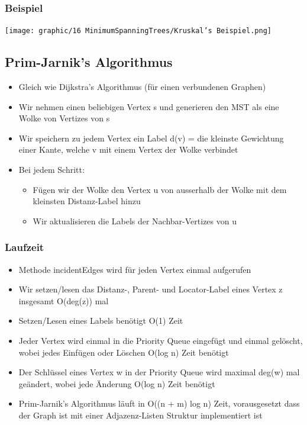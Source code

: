 \subsubsection{Beispiel}
\begin{center}
    \texttt{[image: graphic/16 MinimumSpanningTrees/Kruskal’s Beispiel.png]}
\end{center}
\vspace{-8pt}

\subsection{Prim-Jarnik’s Algorithmus}
\begin{itemize}
    \item Gleich wie Dijkstra’s Algorithmus (für einen verbundenen Graphen)
    \item Wir nehmen einen beliebigen Vertex s und generieren den MST als eine Wolke von Vertizes von s
    \item Wir speichern zu jedem Vertex ein Label d(v) = die kleinste Gewichtung einer Kante, welche v mit einem Vertex der Wolke verbindet
    \item Bei jedem Schritt:
    \begin{itemize}
        \item Fügen wir der Wolke den Vertex u von ausserhalb der Wolke mit dem kleinsten Distanz-Label hinzu
        \item Wir aktualisieren die Labels der Nachbar-Vertizes von u
    \end{itemize}
\end{itemize}
\subsubsection{Laufzeit}
\begin{itemize}
    \item Methode incidentEdges wird für jeden Vertex einmal aufgerufen
    \item Wir setzen/lesen das Distanz-, Parent- und Locator-Label eines Vertex z insgesamt O(deg(z)) mal
    \item Setzen/Lesen eines Labels benötigt O(1) Zeit
    \item Jeder Vertex wird einmal in die Priority Queue eingefügt und einmal gelöscht, wobei jedes Einfügen oder Löschen O(log n) Zeit benötigt
    \item Der Schlüssel eines Vertex w in der Priority Queue wird maximal deg(w) mal geändert, wobei jede Änderung O(log n) Zeit benötigt
    \item Prim-Jarnik’s Algorithmus läuft in O((n + m) log n) Zeit, vorausgesetzt dass der Graph ist mit einer Adjazenz-Listen Struktur implementiert ist
\end{itemize}
